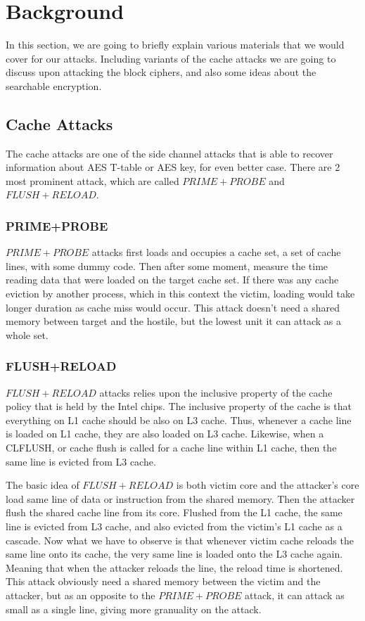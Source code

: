 \documentclass[a4paper]{article}
\begin{document}
\section{Background}

In this section, we are going to briefly explain various materials that we would cover for our attacks. Including variants of the cache attacks we are going to discuss upon attacking the block ciphers, and also some ideas about the searchable encryption.

\subsection{Cache Attacks}

The cache attacks are one of the side channel attacks that is able to recover information about AES T-table or AES key, for even better case. There are 2 most prominent attack, which are called $PRIME+PROBE$ and $FLUSH+RELOAD$.

\subsubsection{PRIME+PROBE}

$PRIME+PROBE$ attacks first loads and occupies a cache set, a set of cache lines, with some dummy code. Then after some moment, measure the time reading data that were loaded on the target cache set. If there was any cache eviction by another process, which in this context the victim, loading would take longer duration as cache miss would occur. This attack doesn't need a shared memory between target and the hostile, but the lowest unit it can attack as a whole set.

\subsubsection{FLUSH+RELOAD}

$FLUSH+RELOAD$ attacks relies upon the inclusive property of the cache policy that is held by the Intel chips. The inclusive property of the cache is that everything on L1 cache should be also on L3 cache. Thus, whenever a cache line is loaded on L1 cache, they are also loaded on L3 cache. Likewise, when a CLFLUSH, or cache flush is called for a cache line within L1 cache, then the same line is evicted from L3 cache.\par
The basic idea of $FLUSH+RELOAD$ is both victim core and the attacker's core load same line of data or instruction from the shared memory. Then the attacker flush the shared cache line from its core. Flushed from the L1 cache, the same line is evicted from L3 cache, and also evicted from the victim's L1 cache as a cascade. Now what we have to observe is that whenever victim cache reloads the same line onto its cache, the very same line is loaded onto the L3 cache again. Meaning that when the attacker reloads the line, the reload time is shortened. This attack obviously need a shared memory between the victim and the attacker, but as an opposite to the $PRIME+PROBE$ attack, it can attack as small as a single line, giving more granuality on the attack.
\end{document}
